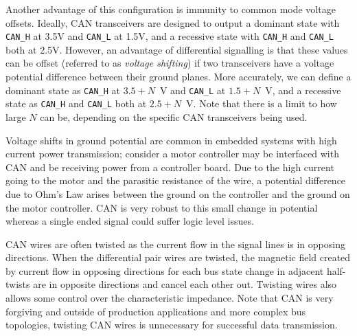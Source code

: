 \documentclass[main.tex]{subfiles}
\begin{document}
\noindent Another advantage of this configuration is immunity to common mode voltage offsets. Ideally, CAN transceivers are designed to output a dominant state with \texttt{CAN\_H} at 3.5V and \texttt{CAN\_L} at 1.5V, and a recessive state with \texttt{CAN\_H} and \texttt{CAN\_L} both at 2.5V. However, an advantage of differential signalling is that these values can be offset (referred to as \textit{voltage shifting}) if two transceivers have a voltage potential difference between their ground planes. More accurately, we can define a dominant state as \texttt{CAN\_H} at \(3.5 + N\)~V and \texttt{CAN\_L} at \(1.5 + N\)~V, and a recessive state as \texttt{CAN\_H} and \texttt{CAN\_L} both at \(2.5 + N\)~V. Note that there is a limit to how large \(N\) can be, depending on the specific CAN transceivers being used.

\noindent Voltage shifts in ground potential are common in embedded systems with high current power transmission; consider a motor controller may be interfaced with CAN and be receiving power from a controller board. Due to the high current going to the motor and the parasitic resistance of the wire, a potential difference due to Ohm's Law arises between the ground on the controller and the ground on the motor controller. CAN is very robust to this small change in potential whereas a single ended signal could suffer logic level issues. \newline

\noindent CAN wires are often twisted as the current flow in the signal lines is in opposing directions. When the differential pair wires are twisted, the magnetic field created by current flow in opposing directions for each bus state change in adjacent half-twists are in opposite directions and cancel each other out. Twisting wires also allows some control over the characteristic impedance. Note that CAN is very forgiving and outside of production applications and more complex bus topologies, twisting CAN wires is unnecessary for successful data transmission. 
\end{document}
